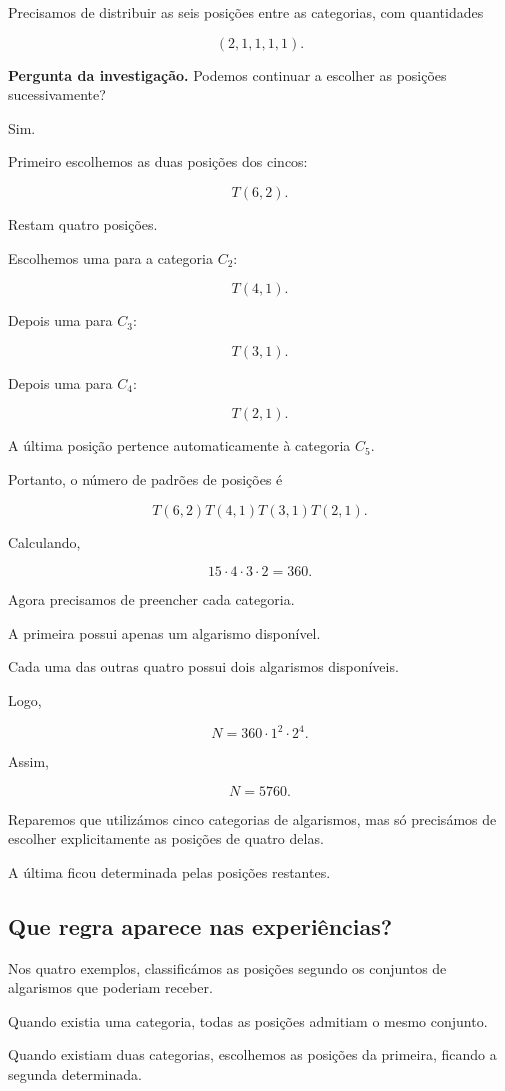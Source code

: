 \documentclass[11pt,a4paper,oneside]{book}
\newcommand{\Pergunta}[1]{\begin{perguntabox}\textbf{Pergunta da investigação.} #1\end{perguntabox}}
\begin{document}
Precisamos de distribuir as seis
posições entre as categorias,
com quantidades

\[
(2,1,1,1,1).
\]

\Pergunta{Podemos continuar a escolher
as posições sucessivamente?}

Sim.

Primeiro escolhemos as duas
posições dos cincos:

\[
T(6,2).
\]

Restam quatro posições.

Escolhemos uma para a categoria $C_2$:

\[
T(4,1).
\]

Depois uma para $C_3$:

\[
T(3,1).
\]

Depois uma para $C_4$:

\[
T(2,1).
\]

A última posição pertence
automaticamente à categoria $C_5$.

Portanto, o número de padrões
de posições é

\[
T(6,2)T(4,1)T(3,1)T(2,1).
\]

Calculando,

\[
15\cdot4\cdot3\cdot2=360.
\]

Agora precisamos de preencher
cada categoria.

A primeira possui apenas
um algarismo disponível.

Cada uma das outras quatro
possui dois algarismos disponíveis.

Logo,

\[
N=360\cdot1^2\cdot2^4.
\]

Assim,

\[
\boxed{N=5760}.
\]

Reparemos que utilizámos
cinco categorias de algarismos,
mas só precisámos de escolher
explicitamente as posições
de quatro delas.

A última ficou determinada
pelas posições restantes.

\subsection*{Que regra aparece nas experiências?}

Nos quatro exemplos, classificámos
as posições segundo os conjuntos
de algarismos que poderiam receber.

Quando existia uma categoria,
todas as posições admitiam
o mesmo conjunto.

Quando existiam duas categorias,
escolhemos as posições da primeira,
ficando a segunda determinada.
\end{document}
